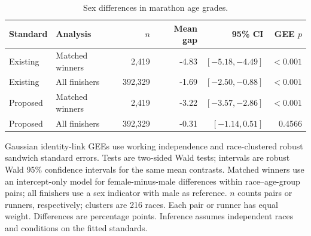 \begin{table}[htbp]
\centering
\small
\caption{Sex differences in marathon age grades.}
\label{tab:marathon-test-table}
\setlength{\tabcolsep}{4pt}
\begin{tabular}{llrrrr}
\toprule
Standard & Analysis & $n$ & Mean gap & 95\% CI & GEE $p$ \\
\midrule
Existing & Matched winners & 2,419 & -4.83 & $[-5.18, -4.49]$ & $<0.001$ \\
Existing & All finishers & 392,329 & -1.69 & $[-2.50, -0.88]$ & $<0.001$ \\
Proposed & Matched winners & 2,419 & -3.22 & $[-3.57, -2.86]$ & $<0.001$ \\
Proposed & All finishers & 392,329 & -0.31 & $[-1.14, 0.51]$ & 0.4566 \\
\bottomrule
\end{tabular}
\par\medskip
\begin{minipage}{\textwidth}
\footnotesize
Gaussian identity-link GEEs use working independence and race-clustered robust sandwich standard errors. Tests are two-sided Wald tests; intervals are robust Wald 95\% confidence intervals for the same mean contrasts. Matched winners use an intercept-only model for female-minus-male differences within race--age-group pairs; all finishers use a sex indicator with male as reference. $n$ counts pairs or runners, respectively; clusters are 216 races. Each pair or runner has equal weight. Differences are percentage points. Inference assumes independent races and conditions on the fitted standards.
\end{minipage}
\end{table}
